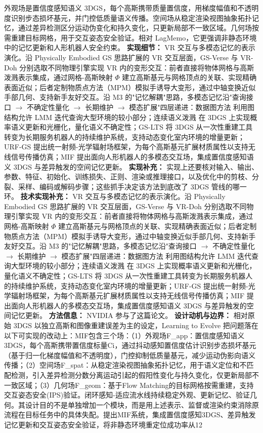 外观场是置信度感知语义 3DGS，每个高斯携带质量置信度，用梯度幅值和不透明度识别步态损坏基元，并门控低质量语义传播。空间场从稳定渲染视图抽象拓扑记忆，通过差异检测区分运动伪变化和持久变化，只更新局部不一致区域。几何场按需重建目标网格，用于交互姿态安全验证。相对 LagMemo，它更强调非静态环境中的记忆更新和人形机器人安全约束。
\textbf{实现细节：} VR 交互与多模态记忆的表示演化。沿 Physically Embodied GS 思路扩展的 VR 交互层面，GS-Verse 与 VR-Doh 分别选取不同物理引擎实现 VR 内的变形交互：前者直接将物体网格与高斯泼溅表示集成，通过网格-高斯映射 $\Phi$ 建立高斯基元与网格顶点的关联、实现精确表面近似；后者定制物质点方法（MPM）模拟手诱导大变形，通过中轴变换近似手部几何、支持新手友好交互。沿 M3 的"记忆解耦"思路，多模态记忆沿"查询接口 $\to$ 不确定性量化 $\to$ 长期维护 $\to$ 模态扩展"四层递进：数据图方法 利用图结构允许 LMM 迭代查询大型环境的较小部分；连续语义泼溅 在 3DGS 上实现概率语义更新和光栅化，量化语义不确定性；GS-LTS 将 3DGS 从一次性重建工具转变为长期服务机器人的持续维护系统，支持动态变化室内环境的增量更新；URF-GS 提出统一射频-光学辐射场框架，为每个高斯基元扩展材质属性以支持无线信号传播仿真；MIF 提出面向人形机器人的多模态交互场，集成置信度感知语义 3DGS 与差异触发的空间记忆更新。
\textbf{实现补充：} 实现上还要核对输入、输出、参数、特征、初始化、训练损失、正则、渲染或推理接口，以及优化中的剪枝、分裂、采样、编码或解码步骤；这些抓手决定该方法到底改了 3DGS 管线的哪一环。
\textbf{技术实现补充：} VR 交互与多模态记忆的表示演化。沿 Physically Embodied GS 思路扩展的 VR 交互层面，GS-Verse 与 VR-Doh 分别选取不同物理引擎实现 VR 内的变形交互：前者直接将物体网格与高斯泼溅表示集成，通过网格-高斯映射 $\Phi$ 建立高斯基元与网格顶点的关联、实现精确表面近似；后者定制物质点方法（MPM）模拟手诱导大变形，通过中轴变换近似手部几何、支持新手友好交互。沿 M3 的"记忆解耦"思路，多模态记忆沿"查询接口 $\to$ 不确定性量化 $\to$ 长期维护 $\to$ 模态扩展"四层递进：数据图方法 利用图结构允许 LMM 迭代查询大型环境的较小部分；连续语义泼溅 在 3DGS 上实现概率语义更新和光栅化，量化语义不确定性；GS-LTS 将 3DGS 从一次性重建工具转变为长期服务机器人的持续维护系统，支持动态变化室内环境的增量更新；URF-GS 提出统一射频-光学辐射场框架，为每个高斯基元扩展材质属性以支持无线信号传播仿真；MIF 提出面向人形机器人的多模态交互场，集成置信度感知语义 3DGS 与差异触发的空间记忆更新。
\textbf{方法信息：} NVIDIA 参与了这篇论文。
\textbf{设计动机与边界：} 相对原始 3DGS 以独立高斯和图像重建误差为主的设定，Learning to Evolve 把问题落在以下可实现的改动上：MIF包含三个场：（1）外观场F\_app：置信度感知语义3DGS，每个高斯携带置信度标量Ci，通过抖动感知置信度估计识别步态损坏基元（基于归一化梯度幅值和不透明度），门控抑制低质量基元，减少运动伪影向语义传播；（2）空间场F\_spat：从稳定渲染视图抽象拓扑记忆，用于语义定位和不匹配检测，引入差异检测分数分离运动引起的假阳性变化与持久变化，仅更新局部不一致区域；（3）几何场F\_geom：基于Flow Matching的目标网格按需重建，支持交互姿态安全(IPS)验证。闭环感知-适应流水线持续稳定外观、更新记忆、验证几何。其设计目的不是单独增加一个模块，而是用上述表示、监督或渲染约束消除原流程在目标任务中的具体失配。提出MIF系统，集成置信度感知3DGS、差异触发记忆更新和交互姿态安全验证，将非静态环境重定位成功率从12%

